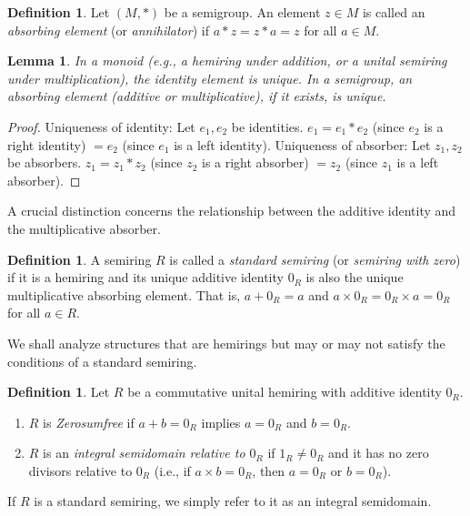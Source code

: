 \documentclass[11pt, a4paper]{article}
\theoremstyle{plain}
\newtheorem{lemma}[theorem]{Lemma}
\theoremstyle{definition}
\newtheorem{definition}[theorem]{Definition}
\numberwithin{equation}{section}
\begin{document}
\begin{definition}\label{def:absorbing_element}
Let $(M, *)$ be a semigroup. An element $z \in M$ is called an \emph{absorbing element} (or \emph{annihilator}) if $a*z=z*a=z$ for all $a \in M$.
\end{definition}

\begin{lemma}\label{lem:unique_identity_absorber}
In a monoid (e.g., a hemiring under addition, or a unital semiring under multiplication), the identity element is unique. In a semigroup, an absorbing element (additive or multiplicative), if it exists, is unique.
\end{lemma}
\begin{proof}
Uniqueness of identity: Let $e_1, e_2$ be identities. $e_1 = e_1 * e_2$ (since $e_2$ is a right identity) $= e_2$ (since $e_1$ is a left identity).
Uniqueness of absorber: Let $z_1, z_2$ be absorbers. $z_1 = z_1 * z_2$ (since $z_2$ is a right absorber) $= z_2$ (since $z_1$ is a left absorber).
\end{proof}

A crucial distinction concerns the relationship between the additive identity and the multiplicative absorber.

\begin{definition}\label{def:semiring_with_zero}
A semiring $R$ is called a \emph{standard semiring} (or \emph{semiring with zero}) if it is a hemiring and its unique additive identity $0_R$ is also the unique multiplicative absorbing element. That is, $a+0_R=a$ and $a \times 0_R = 0_R \times a = 0_R$ for all $a \in R$.
\end{definition}

We shall analyze structures that are hemirings but may or may not satisfy the conditions of a standard semiring.

\begin{definition}\label{def:zerosumfree_integral}
Let $R$ be a commutative unital hemiring with additive identity $0_R$.
\begin{enumerate}
    \item $R$ is \emph{Zerosumfree} if $a+b=0_R$ implies $a=0_R$ and $b=0_R$.
    \item $R$ is an \emph{integral semidomain relative to $0_R$} if $1_R \neq 0_R$ and it has no zero divisors relative to $0_R$ (i.e., if $a\times b = 0_R$, then $a=0_R$ or $b=0_R$).
\end{enumerate}
If $R$ is a standard semiring, we simply refer to it as an integral semidomain.
\end{definition}
\end{document}
